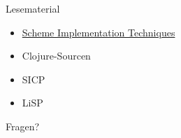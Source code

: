\documentclass[presentation]{beamer}
\begin{document}
\begin{frame}[label=sec-4-2]{Lesematerial}
\begin{itemize}
\item \href{http://www.call-with-current-continuation.org/scheme-implementation-techniques.pdf}{Scheme Implementation Techniques}
\item Clojure-Sourcen
\item SICP
\item LiSP
\end{itemize}
\end{frame}

\begin{frame}[label=sec-4-3]{Fragen?}
\end{frame}
\end{document}
